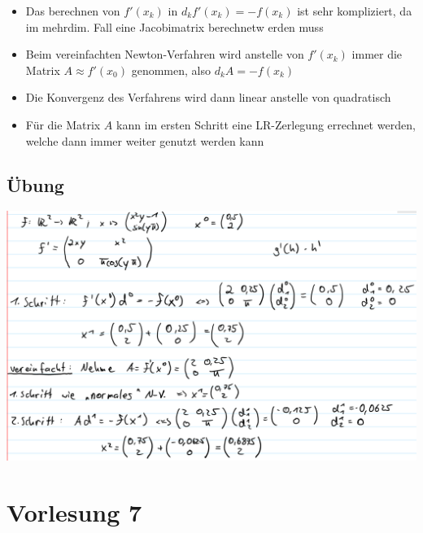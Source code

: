 \documentclass[]{article}
\begin{document}
\begin{enumerate}
			\begin{itemize}
				\item Das berechnen von $f'(x_k)$ in $d_k f'(x_k) = -f(x_k)$ ist sehr kompliziert, da im mehrdim. Fall eine Jacobimatrix berechnetw erden muss
				\item Beim vereinfachten Newton-Verfahren wird anstelle von $f'(x_k)$ immer die Matrix $A \approx f'(x_0)$ genommen, also $d_k A = -f(x_k)$
				\item Die Konvergenz des Verfahrens wird dann linear anstelle von quadratisch
				\item Für die Matrix $A$ kann im ersten Schritt eine LR-Zerlegung errechnet werden, welche dann immer weiter genutzt werden kann
			\end{itemize}	
	\end{enumerate}
\subsection{Übung}
	\includegraphics[width=\textwidth]{res/vl6-1.png}	

\section{Vorlesung 7}
\end{document}
